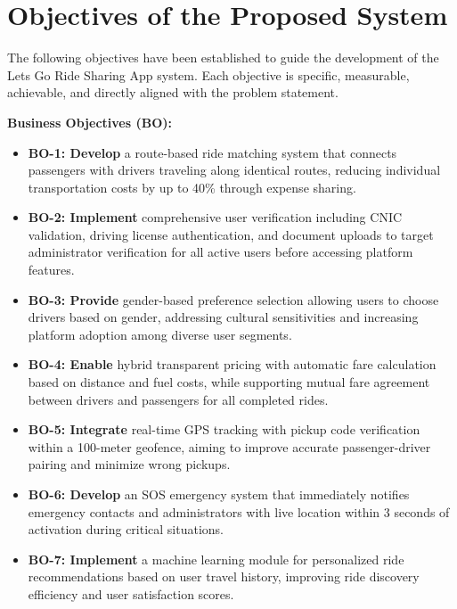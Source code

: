 \section{Objectives of the Proposed System}

The following objectives have been established to guide the development of the Lets Go Ride Sharing App system. Each objective is specific, measurable, achievable, and directly aligned with the problem statement.

\vspace{0.3cm}

\textbf{Business Objectives (BO):}

\begin{itemize}
    \item \textbf{BO-1: Develop} a route-based ride matching system that connects passengers with drivers traveling along identical routes, reducing individual transportation costs by up to 40\% through expense sharing.
    
    \item \textbf{BO-2: Implement} comprehensive user verification including CNIC validation, driving license authentication, and document uploads to target administrator verification for all active users before accessing platform features.
    
    \item \textbf{BO-3: Provide} gender-based preference selection allowing users to choose drivers based on gender, addressing cultural sensitivities and increasing platform adoption among diverse user segments.
    
    \item \textbf{BO-4: Enable} hybrid transparent pricing with automatic fare calculation based on distance and fuel costs, while supporting mutual fare agreement between drivers and passengers for all completed rides.
    
    \item \textbf{BO-5: Integrate} real-time GPS tracking with pickup code verification within a 100-meter geofence, aiming to improve accurate passenger-driver pairing and minimize wrong pickups.
    
    \item \textbf{BO-6: Develop} an SOS emergency system that immediately notifies emergency contacts and administrators with live location within 3 seconds of activation during critical situations.
    
    \item \textbf{BO-7: Implement} a machine learning module for personalized ride recommendations based on user travel history, improving ride discovery efficiency and user satisfaction scores.
    

\end{itemize}
